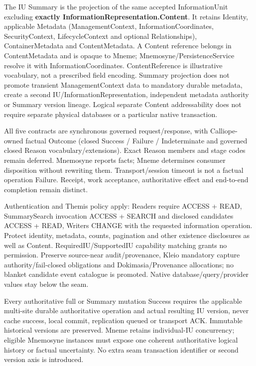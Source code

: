 The IU Summary is the projection of the same accepted InformationUnit excluding \textbf{exactly InformationRepresentation.Content}. It retains Identity, applicable Metadata (ManagementContext, InformationCoordinates, SecurityContext, LifecycleContext and optional Relationships), ContainerMetadata and ContentMetadata. A Content reference belongs in ContentMetadata and is opaque to Mneme; Mnemosyne/PersistenceService resolve it with InformationCoordinates. ContentReference is illustrative vocabulary, not a prescribed field encoding. Summary projection does not promote transient ManagementContext data to mandatory durable metadata, create a second IU/InformationRepresentation, independent metadata authority or Summary version lineage. Logical separate Content addressability does not require separate physical databases or a particular native transaction.



All five contracts are synchronous governed request/response, with Calliope-owned factual Outcome (closed Success / Failure / Indeterminate and governed closed Reason vocabulary/extensions). Exact Reason members and stage codes remain deferred. Mnemosyne reports facts; Mneme determines consumer disposition without rewriting them. Transport/session timeout is not a factual operation Failure. Receipt, work acceptance, authoritative effect and end-to-end completion remain distinct.



Authentication and Themis policy apply: Readers require ACCESS + READ, SummarySearch invocation ACCESS + SEARCH and disclosed candidates ACCESS + READ, Writers CHANGE with the requested information operation. Protect identity, metadata, counts, pagination and other existence disclosures as well as Content. RequiredIU/SupportedIU capability matching grants no permission. Preserve source-near audit/provenance, Kleio mandatory capture authority/fail-closed obligations and Dokimasia/Provenance allocations; no blanket candidate event catalogue is promoted. Native database/query/provider values stay below the seam.



Every authoritative full or Summary mutation Success requires the applicable multi-site durable authoritative operation and actual resulting IU version, never cache success, local commit, replication queued or transport ACK. Immutable historical versions are preserved. Mneme retains individual-IU concurrency; eligible Mnemosyne instances must expose one coherent authoritative logical history or factual uncertainty. No extra seam transaction identifier or second version axis is introduced.



